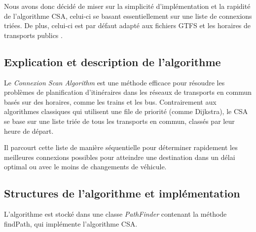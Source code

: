 \documentclass[12pt]{article}
\begin{document}
Nous avons donc décidé de miser sur la simplicité d'implémentation et la rapidité de l'algorithme CSA, celui-ci
se basant essentiellement sur une liste de connexions triées. De plus, celui-ci est par défaut adapté aux fichiers GTFS et les horaires de transports publics \cite{linkGTFSCSA}.

\subsection{Explication et description de l'algorithme}
Le \emph{Connexion Scan Algorithm} est une méthode efficace pour résoudre les problèmes de planification d'itinéraires dans 
les réseaux de transports en commun basés sur des horaires, comme les trains et les bus. Contrairement aux algorithmes classiques 
qui utilisent une file de priorité (comme Dijkstra), le CSA se base sur une liste triée de tous les transports en commun, classés par 
leur heure de départ.

Il parcourt cette liste de manière séquentielle pour déterminer rapidement les meilleures connexions possibles pour atteindre une 
destination dans un délai optimal ou avec le moins de changements de véhicule.

\subsection{Structures de l'algorithme et implémentation}
L'algorithme est stocké dans une classe \emph{PathFinder} contenant la méthode findPath, qui implémente l'algorithme CSA.
\end{document}
